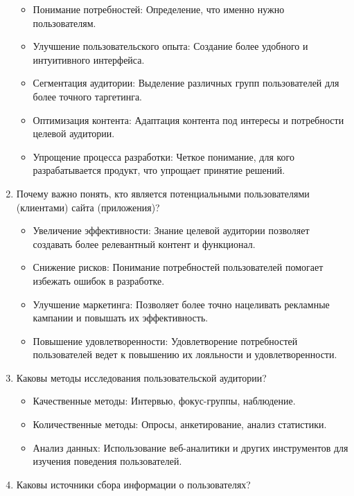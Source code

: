 \begin{enumerate}
    \begin{itemize}
        \item Понимание потребностей: Определение, что именно нужно пользователям.
        \item Улучшение пользовательского опыта: Создание более удобного и интуитивного интерфейса.
        \item Сегментация аудитории: Выделение различных групп пользователей для более точного таргетинга.
        \item Оптимизация контента: Адаптация контента под интересы и потребности целевой аудитории.
        \item Упрощение процесса разработки: Четкое понимание, для кого разрабатывается продукт, что упрощает принятие решений.
    \end{itemize}

\item Почему важно понять, кто является потенциальными пользователями (клиентами) сайта (приложения)?

    \begin{itemize}
        \item Увеличение эффективности: Знание целевой аудитории позволяет создавать более релевантный контент и функционал.
        \item Снижение рисков: Понимание потребностей пользователей помогает избежать ошибок в разработке.
        \item Улучшение маркетинга: Позволяет более точно нацеливать рекламные кампании и повышать их эффективность.
        \item Повышение удовлетворенности: Удовлетворение потребностей пользователей ведет к повышению их лояльности и удовлетворенности.
    \end{itemize}

\item Каковы методы исследования пользовательской аудитории?

    \begin{itemize}
        \item Качественные методы: Интервью, фокус-группы, наблюдение.
        \item Количественные методы: Опросы, анкетирование, анализ статистики.
        \item Анализ данных: Использование веб-аналитики и других инструментов для изучения поведения пользователей.
    \end{itemize}

\item Каковы источники сбора информации о пользователях?


\end{enumerate}
